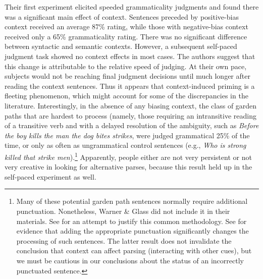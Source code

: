 \noindent
Their first experiment elicited speeded grammaticality judgments and found there was a significant main effect of context. Sentences preceded by positive-bias context received an average 87\% rating, while those with negative-bias context received only a 65\% grammaticality rating. There was no significant  difference between syntactic and semantic contexts. However, a subsequent self-paced judgment task showed no context effects in most cases. The authors suggest that this change is attributable to the relative speed of judging. At their own pace, subjects would not be reaching final judgment decisions until much longer after reading the context sentences. Thus it appears that context-induced priming is a fleeting phenomenon, which might account for some of the discrepancies in the literature. Interestingly, in the absence of any biasing context, the class of garden paths that are hardest to process (namely, those requiring an intransitive reading of a transitive verb and with a delayed resolution of the ambiguity, such as \textit{Before the boy kills the man the dog bites strikes}, were judged grammatical 25\% of the time, or only as often as ungrammatical control sentences (e.g., \textit{Who is strong killed that strike men}).\footnote{Many of these potential garden path sentences normally require additional punctuation. Nonetheless, Warner \& Glass did not include it in their materials. See \citet{FrazierEtAl1982} for an attempt to justify this common methodology. See \citet{MitchellEtAl1985} for evidence that adding the appropriate punctuation significantly changes the processing of such sentences. The latter result does not invalidate the conclusion that context can affect parsing (interacting with other cues), but we must be cautious in our conclusions about the status of an incorrectly punctuated sentence.
}
 Apparently, people either are not very persistent or not very creative in looking for alternative parses, because this result held up in the self-paced experiment as well.

